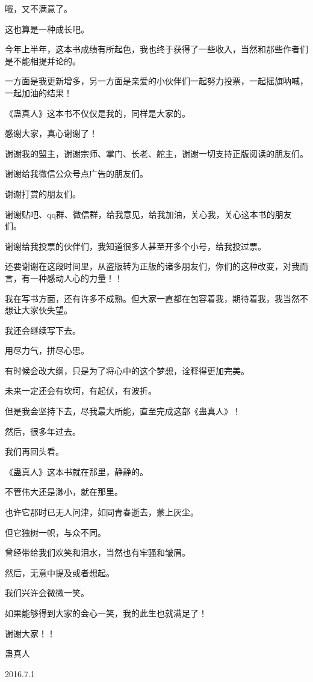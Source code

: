 \begin{this_body}
哦，又不满意了。

这也算是一种成长吧。

今年上半年，这本书成绩有所起色，我也终于获得了一些收入，当然和那些作者们是不能相提并论的。

一方面是我更新增多，另一方面是亲爱的小伙伴们一起努力投票，一起摇旗呐喊，一起加油的结果！

《蛊真人》这本书不仅仅是我的，同样是大家的。

感谢大家，真心谢谢了！

谢谢我的盟主，谢谢宗师、掌门、长老、舵主，谢谢一切支持正版阅读的朋友们。

谢谢给我微信公众号点广告的朋友们。

谢谢打赏的朋友们。

谢谢贴吧、qq群、微信群，给我意见，给我加油，关心我，关心这本书的朋友们。

谢谢给我投票的伙伴们，我知道很多人甚至开多个小号，给我投过票。

还要谢谢在这段时间里，从盗版转为正版的诸多朋友们，你们的这种改变，对我而言，有一种感动人心的力量！！

我在写书方面，还有许多不成熟。但大家一直都在包容着我，期待着我，我当然不想让大家伙失望。

我还会继续写下去。

用尽力气，拼尽心思。

有时候会改大纲，只是为了将心中的这个梦想，诠释得更加完美。

未来一定还会有坎坷，有起伏，有波折。

但是我会坚持下去，尽我最大所能，直至完成这部《蛊真人》！

然后，很多年过去。

我们再回头看。

《蛊真人》这本书就在那里，静静的。

不管伟大还是渺小，就在那里。

也许它那时已无人问津，如同青春逝去，蒙上灰尘。

但它独树一帜，与众不同。

曾经带给我们欢笑和泪水，当然也有牢骚和皱眉。

然后，无意中提及或者想起。

我们兴许会微微一笑。

如果能够得到大家的会心一笑，我的此生也就满足了！

谢谢大家！！

蛊真人

2016.7.1

\end{this_body}

